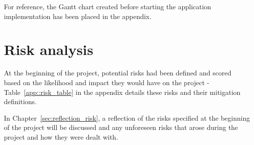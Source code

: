         For reference, the Gantt chart created before starting the application implementation has been placed in the appendix.
        
    \section{Risk analysis}
        \label{sec:sdl_risks}
        At the beginning of the project, potential risks had been defined and scored based on the likelihood and impact they would have on the project\cite{intial_document_pike} - Table~\ref{app::risk_table} in the appendix details these risks and their mitigation definitions.
        
        In Chapter~\ref{sec:reflection_risk}, a reflection of the risks specified at the beginning of the project will be discussed and any unforeseen risks that arose during the project and how they were dealt with.
